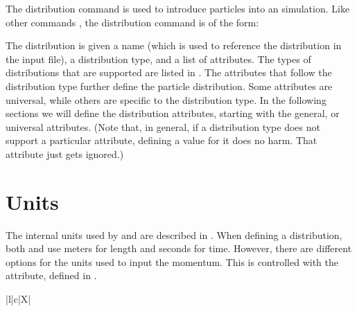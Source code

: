 The distribution command is used to introduce particles into an \opal simulation. Like other \opal
commands , the distribution command is of the form:

The distribution is given a name (which is used to reference the distribution in the \opal input
file), a distribution type, and a list of attributes. The types of distributions that are supported
are listed in . The attributes that follow the distribution type further
define the particle distribution. Some attributes are universal, while others are specific to the
distribution type. In the following sections we will define the distribution attributes, starting
with the general, or universal attributes. (Note that, in general, if a distribution type does not
support a particular attribute, defining a value for it does no harm. That attribute just gets ignored.)

\section{Units}
\label{sec:unitsdistattributes}
\FloatBarrier

The internal units used by \opalt and \opalcycl are described in .
When defining a distribution, both \opalt and \opalcycl use meters for
length and seconds for time. However, there are different options for the units used to input the
momentum. This is controlled with the  attribute, defined in
.

\begin{table}[!htb]
  \begin{center}\footnotesize
    \caption{Definition of  attribute.}
    \label{tab:distattrinputmounits}
    \begin{tabularx}{\textwidth-1cm}{|l|c|X|}
      \hline
      \hline
      \hline
    \end{tabularx}
  \end{center}
\end{table}

